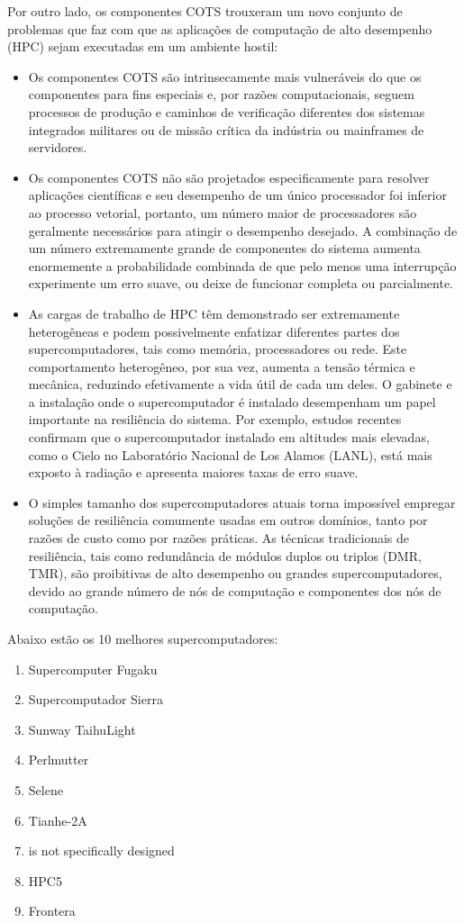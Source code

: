 \documentclass[11pt, letterpaper, portuguese]{article}
\begin{document}
\par{Por outro lado, os componentes COTS trouxeram um novo conjunto de problemas que faz com que as aplicações de computação de alto desempenho (HPC) sejam executadas em um ambiente hostil:}
\begin{itemize}
    \item Os componentes COTS são intrinsecamente mais vulneráveis do que os componentes para fins especiais e, por razões computacionais, seguem processos de produção e caminhos de verificação diferentes dos sistemas integrados militares ou de missão crítica da indústria ou mainframes de servidores.
    \item Os componentes COTS não são projetados especificamente para resolver aplicações científicas e seu desempenho de um único processador foi inferior ao processo vetorial, portanto, um número maior de processadores são geralmente necessários para atingir o desempenho desejado. A combinação de um número extremamente grande de componentes do sistema aumenta enormemente a probabilidade combinada de que pelo menos uma interrupção experimente um erro suave, ou deixe de funcionar completa ou parcialmente.
    \item As cargas de trabalho de HPC têm demonstrado ser extremamente heterogêneas e podem possivelmente enfatizar diferentes partes dos supercomputadores, tais como memória, processadores ou rede. Este comportamento heterogêneo, por sua vez, aumenta a tensão térmica e mecânica, reduzindo efetivamente a vida útil de cada um deles. O gabinete e a instalação onde o supercomputador é instalado desempenham um papel importante na resiliência do sistema. Por exemplo, estudos recentes confirmam que o supercomputador instalado em altitudes mais elevadas, como o Cielo no Laboratório Nacional de Los Alamos (LANL), está mais exposto à radiação e apresenta maiores taxas de erro suave.
    \item O simples tamanho dos supercomputadores atuais torna impossível empregar soluções de resiliência comumente usadas em outros domínios, tanto por razões de custo como por razões práticas. As técnicas tradicionais de resiliência, tais como redundância de módulos duplos ou triplos (DMR, TMR), são proibitivas de alto desempenho ou grandes supercomputadores, devido ao grande número de nós de computação e componentes dos nós de computação. 
\end{itemize}

\par {Abaixo estão os 10 melhores supercomputadores:}
\begin{enumerate}[1.]
    \item Supercomputer Fugaku
    \item Supercomputador Sierra
    \item Sunway TaihuLight
    \item Perlmutter
    \item Selene
    \item Tianhe-2A
    \item is not specifically designed
    \item HPC5
    \item Frontera
\end{enumerate}
\end{document}
